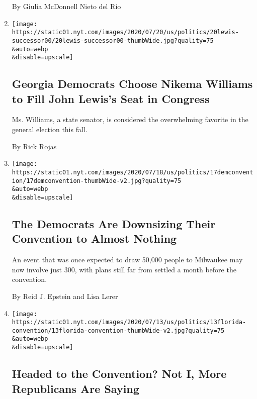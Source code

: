 \begin{enumerate}
  By Giulia McDonnell Nieto del Rio
\item
  \href{/2020/07/20/us/politics/john-lewis-successor-congress.html}{}

  \texttt{[image: https://static01.nyt.com/images/2020/07/20/us/politics/20lewis-successor00/20lewis-successor00-thumbWide.jpg?quality=75\\\&auto=webp\\\&disable=upscale]}

  \hypertarget{georgia-democrats-choose-nikema-williams-to-fill-john-lewiss-seat-in-congress}{%
  \subsection{Georgia Democrats Choose Nikema Williams to Fill John
  Lewis's Seat in
  Congress}\label{georgia-democrats-choose-nikema-williams-to-fill-john-lewiss-seat-in-congress}}

  Ms. Williams, a state senator, is considered the overwhelming favorite
  in the general election this fall.

  By Rick Rojas
\item
  \href{/2020/07/17/us/politics/democratic-convention-milwaukee.html}{}

  \texttt{[image: https://static01.nyt.com/images/2020/07/18/us/politics/17demconvention/17demconvention-thumbWide-v2.jpg?quality=75\\\&auto=webp\\\&disable=upscale]}

  \hypertarget{the-democrats-are-downsizing-their-convention-to-almost-nothing}{%
  \subsection{The Democrats Are Downsizing Their Convention to Almost
  Nothing}\label{the-democrats-are-downsizing-their-convention-to-almost-nothing}}

  An event that was once expected to draw 50,000 people to Milwaukee may
  now involve just 300, with plans still far from settled a month before
  the convention.

  By Reid J. Epstein and Lisa Lerer
\item
  \href{/2020/07/13/us/politics/florida-virus-republican-convention.html}{}

  \texttt{[image: https://static01.nyt.com/images/2020/07/13/us/politics/13florida-convention/13florida-convention-thumbWide-v2.jpg?quality=75\\\&auto=webp\\\&disable=upscale]}

  \hypertarget{headed-to-the-convention-not-i-more-republicans-are-saying}{%
  \subsection{Headed to the Convention? Not I, More Republicans Are
  Saying}\label{headed-to-the-convention-not-i-more-republicans-are-saying}}


\end{enumerate}
